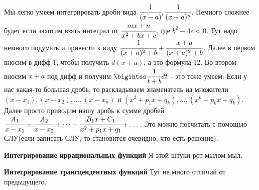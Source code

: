 Мы легко умеем интегрировать дроби вида $\cfrac{1}{(x-a)}, \cfrac{1}{(x-a)^n}$. Немного
сложнее будет если захотим взять интеграл от $\cfrac{mx + n}{x^2+bx+c}$, где $b^2-4c < 0$.
Тут надо немного подумать и привести к виду $\cfrac{1}{(x+a)^2+b}+\cfrac{x+a}{(x+a)^2+b}$.
Далее в первом вносим в дифф 1, чтобы получить $d(x+a)$, а это формула 12. Во втором
вносим $x + a$ под дифф и получим $\bigintss \cfrac{1}{t+b}dt$ - это тоже умеем.\newline
Если у нас какая-то большая дробь, то раскладываем знаменатель на множители 
$(x-x_1), (x-x_2), \dots, (x-x_n)$ и $(x^2 + p_1x+q_k), \dots, (x^k + p_kx + q_k)$.
Далее просто приводим нашу дробь к сумме дробей $\cfrac{A_1}{x-x_1} + \cfrac{A_2}{x-x_2} +
\dots + \cfrac{B_1x+C_1}{x^2 + p_1x + q_1} + \dots $. Это можно посчитать с помощью
СЛУ(если записать СЛУ, то становится очевидно, что есть решение).

\textbf{Интегрирование иррациональных функций} Я этой штуки рот мылом мыл.

\textbf{Интегрирование трансцендентных функций} Тут не много отличий от предыдущего.
